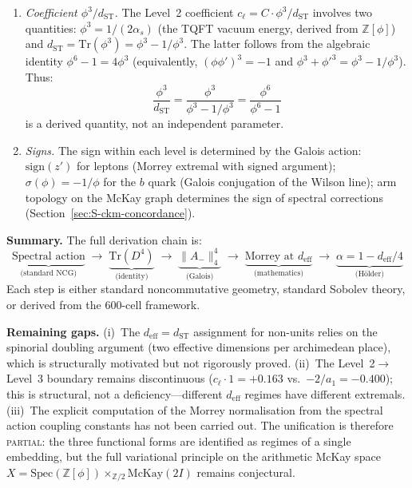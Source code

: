 \documentclass[12pt,a4paper]{article}
\theoremstyle{definition}
\begin{document}
\begin{enumerate}
\item[(E)] \emph{Coefficient $\phi^3/d_{\text{ST}}$.}  The Level~2 coefficient $c_\ell = C \cdot \phi^3/d_{\text{ST}}$ involves two quantities: $\phi^3 = 1/(2\alpha_s)$ (the TQFT vacuum energy, derived from $\mathbb{Z}[\phi]$) and $d_{\text{ST}} = \mathrm{Tr}(\phi^3) = \phi^3 - 1/\phi^3$.  The latter follows from the algebraic identity $\phi^6 - 1 = 4\phi^3$ (equivalently, $(\phi\phi')^3 = -1$ and $\phi^3 + \phi'^3 = \phi^3 - 1/\phi^3$).  Thus:
\begin{equation}
\frac{\phi^3}{d_{\text{ST}}} = \frac{\phi^3}{\phi^3 - 1/\phi^3} = \frac{\phi^6}{\phi^6 - 1}
\end{equation}
is a derived quantity, not an independent parameter.

\item[(F)] \emph{Signs.}  The sign within each level is determined by the Galois action: $\mathrm{sign}(z')$ for leptons (Morrey extremal with signed argument); $\sigma(\phi) = -1/\phi$ for the $b$ quark (Galois conjugation of the Wilson line); arm topology on the McKay graph determines the sign of spectral corrections (Section~\ref{sec:S-ckm-concordance}).
\end{enumerate}

\textbf{Summary.}  The full derivation chain is:
\[
\underbrace{\text{Spectral action}}_{\text{(standard NCG)}} \;\to\; \underbrace{\mathrm{Tr}(D^4)}_{\text{(identity)}} \;\to\; \underbrace{\|A_-\|_4^4}_{\text{(Galois)}} \;\to\; \underbrace{\text{Morrey at } d_{\text{eff}}}_{\text{(mathematics)}} \;\to\; \underbrace{\alpha = 1 - d_{\text{eff}}/4}_{\text{(H\"{o}lder)}}
\]
Each step is either standard noncommutative geometry, standard Sobolev theory, or derived from the 600-cell framework.

\textbf{Remaining gaps.}  (i)~The $d_{\text{eff}} = d_{\text{ST}}$ assignment for non-units relies on the spinorial doubling argument (two effective dimensions per archimedean place), which is structurally motivated but not rigorously proved.  (ii)~The Level~2$\to$Level~3 boundary remains discontinuous ($c_\ell \cdot 1 = +0.163$ vs.\ $-2/a_1 = -0.400$); this is structural, not a deficiency---different $d_{\text{eff}}$ regimes have different extremals.  (iii)~The explicit computation of the Morrey normalisation from the spectral action coupling constants has not been carried out.  The unification is therefore \textsc{partial}: the three functional forms are identified as regimes of a single embedding, but the full variational principle on the arithmetic McKay space $X = \mathrm{Spec}(\mathbb{Z}[\phi]) \times_{\mathbb{Z}/2} \text{McKay}(2I)$ remains conjectural.
\end{document}
